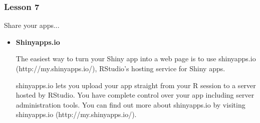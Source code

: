 \documentclass{article}
\begin{document}
\subsubsection*{Lesson 7}
Share your apps...
\begin{itemize}
\item {\bf Shinyapps.io}

The easiest way to turn your Shiny app into a web page is to use shinyapps.io (http://my.shinyapps.io/), RStudio's hosting service for Shiny apps. 

shinyapps.io lets you upload your app straight from your R session to a server hosted by RStudio. You have complete control over your app including server administration tools. You can find out more about shinyapps.io by visiting shinyapps.io (http://my.shinyapps.io/).
\end{itemize}
\end{document}
